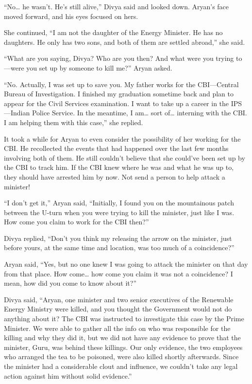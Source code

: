 “No… he wasn't. He's still alive,” Divya said and looked down. Aryan's face
moved forward, and his eyes focused on hers.

She continued, “I am not the daughter of the Energy Minister. He has no
daughters. He only has two sons, and both of them are settled abroad,” she said.

“What are you saying, Divya? Who are you then? And what were you trying to—were
you set up by someone to kill me?” Aryan asked.

“No. Actually, I was set up to save you. My father works for the CBI—Central
Bureau of Investigation. I finished my graduation sometime back and plan to
appear for the Civil Services examination. I want to take up a career in the 
IPS—Indian Police Service. In the meantime, I am… sort of… interning with
the CBI. I am helping them with this case,” she replied.

It took a while for Aryan to even consider the possibility of her working for
the CBI. He recollected the events that had happened over the last few months
involving both of them. He still couldn't believe that she could've been set up
by the CBI to track him. If the CBI knew where he was and what he was up to,
they should have arrested him by now. Not send a person to help attack a
minister!

“I don't get it,” Aryan said, “Initially, I found you on the mountainous patch
between the U-turn when you were trying to kill the minister, just like I was.
How come you claim to work for the CBI then?”

Divya replied, “Don't you think my releasing the arrow on the minister, just
before yours, at the same time and location, was too much of a coincidence?”

Aryan said, “Yes, but no one knew I was going to attack the minister on that day
from that place. How come… how come you claim it was not a coincidence? I
mean, how did you come to know about it?”

Divya said, “Aryan, one minister and two senior executives of the Renewable
Energy Ministry were killed, and you thought the Government would not do
anything about it? The CBI was instructed to investigate this case by the Prime
Minister. We were able to gather all the info on who was responsible for the
killing and why they did it, but we did not have any evidence to prove that the
minister, Guru, was behind these killings. Our only evidence, the two employees
who arranged the tea to be poisoned, were also killed shortly afterwards. Since
the minister had a considerable clout and influence, we couldn't take any legal
action against him without solid evidence.”

